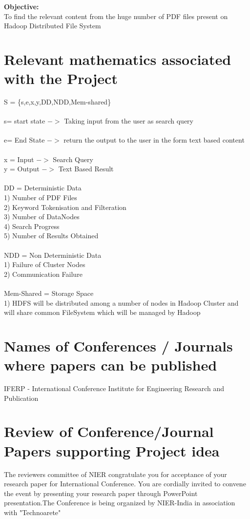 \documentclass[oneside,a4paper,12pt]{report}
\begin{document}
\noindent \textbf{Objective:} \\
To find the relevant content from the huge number of PDF files present on Hadoop Distributed File System \\

	
\section{Relevant mathematics associated with the Project}
\noindent
S = \{s,e,x,y,DD,NDD,Mem-shared\} \\ \\
s= start state $->$ Taking input from the user as search query\\ \\ e= End State $->$ return the output to the user in the form text based content \\ \\
x = Input $->$ Search Query \\
y = Output $->$ Text Based Result \\ \\ 
DD = Deterministic Data \\
1) Number of PDF Files \\ 
2) Keyword Tokenisation and Filteration \\
3) Number of DataNodes \\
4) Search Progress \\
5) Number of Results Obtained \\ \\
NDD = Non Deterministic Data \\
1) Failure of Cluster Nodes \\
2) Communication Failure  \\ \\
Mem-Shared = Storage Space \\ 
1) HDFS will be distributed among a number of nodes in Hadoop Cluster and will share common FileSystem which will be managed by Hadoop \\



\section{Names of Conferences / Journals where papers can be published}
IFERP - International Conference Institute for Engineering Research and Publication  


\section{Review of Conference/Journal Papers supporting Project idea}
\label{sec:survey}
The reviewers committee of NIER congratulate  you for acceptance of your research paper for International Conference. You are cordially invited to convene the event by presenting your research paper through PowerPoint presentation.The Conference is being organized by NIER-India in association with "Technoarete"
\end{document}
